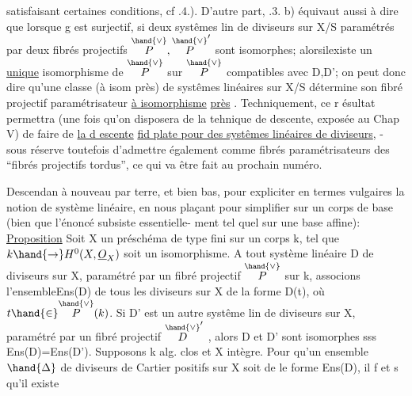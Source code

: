 
satisfaisant certaines conditions, cf .4.). D'autre part, .3. b)
équivaut  aussi à dire que lorsque g est surjectif, si deux systêmes lin de diviseurs
sur X/S  paramétrés par deux fibrés projectifs $\overset{\hand{\vee}}{P},\overset{\hand{\vee}}{P}'$ sont isomorphes;
alorsilexiste un \uline{unique} isomorphisme de $\overset{\hand{\vee}}{P}$ sur $\overset{\hand{\vee}}{P}$ compatibles avec D,D';
on peut donc dire qu'une classe (à isom près) de systêmes linéaires sur
X/S détermine son fibré projectif paramétrisateur \uline{à isomorphisme} 
\uline{près} . Techniquement, ce r ésultat permettra (une fois qu'on disposera
de la tehnique de descente, exposée au Chap V) de faire de \uline{la d escente}
\uline{fid plate pour des systêmes linéaires de diviseurs}, - sous réserve
 toutefois d'admettre également comme fibrés paramétrisateurs des ``fibrés projectifs
tordus'', ce qui va être fait au prochain  numéro.

Descendan à nouveau par terre, et bien bas, pour expliciter en
termes vulgaires la notion de système linéaire, en nous plaçant pour
simplifier sur un corps de base (bien que l'énoncé subsiste essentielle-%
ment tel quel sur une base affine):
\uline{Proposition}  Soit X un préschéma   de type fini sur un corps k,
tel que $k\hand{\to} H^0(X,\underline{O}_X)$ soit un isomorphisme. A tout système linéaire D de
diviseurs  sur X, paramétré par un fibré projectif $\overset{\hand{\vee}}{P}$ sur k, associons
l'ensemble\hand{(!)}Ens(D) de tous les diviseurs sur X de la forme D(t), où
$t\hand{\in}\overset{\hand{\vee}}{P}(k)$.  Si  D' est un autre systême lin de diviseurs sur X, paramétré par un
fibré projectif $\overset{\hand{\vee}}{D}'$ , alors D et D' sont isomorphes sss Ens(D)=Ens(D').
 Supposons k alg. clos et X  intègre.
\hand{(}Pour qu'un ensemble $\hand{\Delta}$ de diviseurs de Cartier positifs sur X soit de
le forme Ens(D), il f et s qu'il existe 

